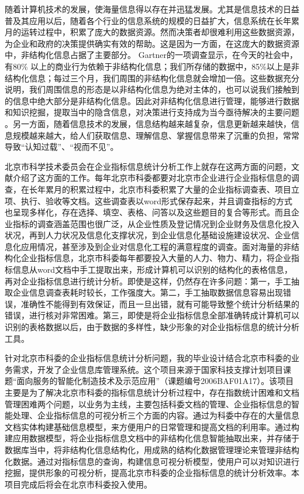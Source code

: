 

随着计算机技术的发展，使海量信息得以存在并迅猛发展。尤其是信息技术的日益普及其应用以后，随着各个行业的信息系统的规模的日益扩大，信息系统在长年累月的运转过程中，积累了庞大的数据资源。然而决策者却很难利用这些数据资源，为企业和政府的决策提供确实有效的帮助。这是因为一方面，在这庞大的数据资源中，非结构化信息占据了主要部分\cite{fsyang-skgao-1998}。 Gartner的一项调查显示，在今天的社会中，有80\% 以上的商业行为依赖于非结构化信息；我们所存储的数据中，85\%以上是非结构化信息；每过三个月，我们周围的非结构化信息就会增加一倍。这些数据充分说明，我们周围信息的形态是以非结构化信息为绝对主体的，也可以说我们接触到的信息中绝大部分是非结构化信息。因此对非结构化信息进行管理，能够进行数据和知识挖掘，提取当中的隐含信息，对决策进行支持成为当今亟待解决的主要问题 \cite{cbchen2008}。另一方面，随着信息技术的发展，信息结构越来越复杂，信息更新越来越快，信息规模越来越大，给人们获取信息、理解信息、掌握信息带来了沉重的负担，常常导致“认知过载”、“视而不见”\cite{dzzhang-ppzhang-2006}\cite{xdxie-1998}。

北京市科学技术委员会在企业指标信息统计分析工作上就存在这两方面的问题，文献\parencite{xdxie-1998}介绍了这方面的工作。每年北京市科委都要对北京市企业进行企业指标信息的调查，在长年累月的积累过程中，北京市科委积累了大量的企业指标调查表、项目立项、执行、验收等文档。这些调查表以word形式保存起来，并且调查指标的方式也呈现多样化，存在选择、填空、表格、问答以及这些题目的复合等形式。而且企业指标的调查涵盖范围也很广泛，从企业性质及登记情况到企业财务及信息化投入状况，再到人力状况及信息化支撑状况，到企业信息化基础设施建设状况、企业信息化应用情况，甚至涉及到企业对信息化工程的满意程度的调查。面对海量的非结构化企业指标信息，北京市科委每年都要投入大量的人力、物力、精力，将企业指标信息从word文档中手工提取出来，形成计算机可以识别的结构化的表格信息，再对企业指标信息进行统计分析。即使是这样，仍然存在许多问题：第一，手工抽取企业信息调查表耗时较长，工作强度大。第二，手工抽取数据信息容易出现错误，准确性不能得到有效保证，而且一旦出错，就有可能导致整个统计分析结果的错误，进行核对非常困难。第三，即使是将企业指标信息全部准确转成计算机可以识别的表格数据以后，由于数据的多样性，缺少形象的对企业指标信息的统计分析工具。 

针对北京市科委的企业指标信息统计分析问题，我的毕业设计结合北京市科委的业务需求，开发了企业信息库管理系统。这个项目来源于国家科技支撑计划项目课题“面向服务的智能化制造技术及示范应用”（课题编号2006BAF01A17）。该项目主要是为了解决北京市科委的指标信息统计分析过程中，存在指数统计困难和文档管理困难两个问题，以业务为主线，主要包括科委文档的管理、企业指标信息的智能处理、企业指标信息的可视分析三个方面的内容。通过为科委中存在的大量信息文档实体构建基础信息模型，来方便用户的日常管理和提高文档的利用率。通过构建应用数据模型，将企业指标信息文档中的非结构化信息智能抽取出来，并存储于数据库当中，将非结构化信息结构化，用成熟的结构化数据管理理论来管理非结构化数据。通过对指标信息的查询，构建信息可视分析模型，使用户可以对知识进行挖掘，提供形象的可视分析，提高北京市科委的企业指标信息的统计分析效率。本项目完成后将会在北京市科委投入使用。


